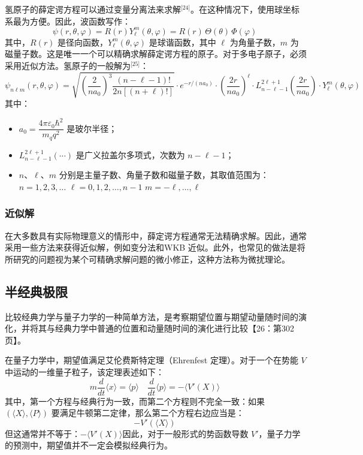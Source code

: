 氢原子的薛定谔方程可以通过变量分离法来求解\(^\text{[24]}\)。在这种情况下，使用球坐标系最为方便。因此，波函数写作：
$$
\psi(r, \theta, \varphi) = R(r) Y_{\ell}^{m}(\theta, \varphi) = R(r)\, \Theta(\theta)\, \Phi(\varphi)~
$$
其中，$R(r)$ 是径向函数，$Y_{\ell}^{m}(\theta, \varphi)$ 是球谐函数，其中 $\ell$ 为角量子数，$m$ 为磁量子数。这是唯一一个可以精确求解薛定谔方程的原子。对于多电子原子，必须采用近似方法。氢原子的一般解为\(^\text{[25]}\)：
$$
\psi_{n\ell m}(r,\theta,\varphi) = \sqrt{\left( \frac{2}{n a_0} \right)^3 \frac{(n - \ell - 1)!}{2n[(n + \ell)!]}} \cdot e^{-r / (n a_0)} \cdot \left( \frac{2r}{n a_0} \right)^\ell \cdot L_{n - \ell - 1}^{2\ell + 1} \left( \frac{2r}{n a_0} \right) \cdot Y_\ell^m(\theta, \varphi)~
$$
其中：
\begin{itemize}
\item $a_0 = \dfrac{4\pi \varepsilon_0 \hbar^2}{m_q q^2}$ 是玻尔半径；
\item $L_{n - \ell - 1}^{2\ell + 1}(\cdots)$ 是广义拉盖尔多项式，次数为 $n - \ell - 1$；
\item $n$、$\ell$、$m$ 分别是主量子数、角量子数和磁量子数，其取值范围为：$n = 1, 2, 3, \dots$ $\ell = 0, 1, 2, \dots, n - 1$ $m = -\ell, \dots, \ell$
\end{itemize}
\subsubsection{近似解}
在大多数具有实际物理意义的情形中，薛定谔方程通常无法精确求解。因此，通常采用一些方法来获得近似解，例如变分法和WKB 近似。此外，也常见的做法是将所研究的问题视为某个可精确求解问题的微小修正，这种方法称为微扰理论。
\subsection{半经典极限}
比较经典力学与量子力学的一种简单方法，是考察期望位置与期望动量随时间的演化，并将其与经典力学中普通的位置和动量随时间的演化进行比较【26：第302页】。

在量子力学中，期望值满足艾伦费斯特定理（Ehrenfest 定理）。对于一个在势能 $V$ 中运动的一维量子粒子，该定理表述如下：
$$
m \frac{d}{dt} \langle x \rangle = \langle p \rangle \quad \frac{d}{dt} \langle p \rangle = -\langle V'(X) \rangle~
$$
其中，第一个方程与经典行为一致，而第二个方程则不完全一致：如果 $(\langle X \rangle, \langle P \rangle)$ 要满足牛顿第二定律，那么第二个方程右边应当是：
$$
- V'\left( \langle X \rangle \right)~
$$
但这通常并不等于：$- \langle V'(X) \rangle$因此，对于一般形式的势函数导数 $V'$，量子力学的预测中，期望值并不一定会模拟经典行为。


